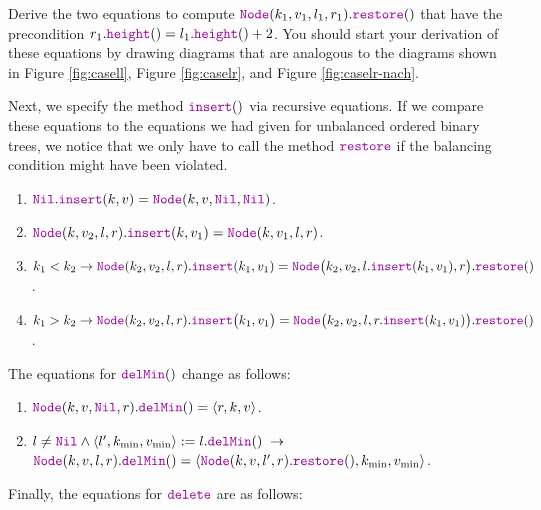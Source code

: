 \exercise
Derive the two equations to compute $\mytt{Node}(k_1,v_1,l_1,r_1).\mytt{restore}()$ that have the
precondition $r_1.\mytt{height}() = l_1.\mytt{height}() + 2$.  You should start your derivation of these
equations by drawing diagrams that are analogous to the diagrams shown in Figure \ref{fig:casell}, Figure
\ref{fig:caselr}, and Figure \ref{fig:caselr-nach}. 
\eox

Next, we specify the method  $\mytt{insert}()$ via recursive equations.
If we compare these equations to the equations we had given for unbalanced ordered binary trees, we
notice that we only have to call the method $\mytt{restore}$ if the balancing condition might have
been violated.
\begin{enumerate}
\item $\mytt{Nil}.\mytt{insert}(k,v) = \mytt{Node}(k,v, \mytt{Nil}, \mytt{Nil})$.  
\item $\mytt{Node}(k, v_2, l, r).\mytt{insert}(k,v_1) = \mytt{Node}(k, v_1, l, r)$.
\item $k_1 < k_2 \rightarrow 
          \mytt{Node}(k_2, v_2, l, r).\mytt{insert}(k_1, v_1) =
          \mytt{Node}\bigl(k_2, v_2, l.\mytt{insert}(k_1,v_1), r\bigr).\mytt{restore}()$.
\item $k_1 > k_2 \rightarrow 
         \mytt{Node}(k_2, v_2, l, r).\mytt{insert}\bigl(k_1, v_1\bigr) = 
         \mytt{Node}\bigl(k_2, v_2, l, r.\mytt{insert}(k_1,v_1)\bigr).\mytt{restore}()$.
\end{enumerate}
The equations for  $\mytt{delMin}()$ change as follows:
\begin{enumerate}
\item $\mytt{Node}(k, v, \mytt{Nil}, r).\mytt{delMin}() = \langle r, k, v \rangle$.
\item $l\not= \mytt{Nil} \wedge \langle l',k_{\textrm{min}}, v_{\textrm{min}}\rangle := l.\mytt{delMin}() 
       \;\rightarrow$ \\[0.2cm]
       \hspace*{1.3cm} 
       $\mytt{Node}(k, v, l, r).\mytt{delMin}() = 
        \langle \mytt{Node}(k, v, l', r).\mytt{restore}(), k_{\textrm{min}}, v_{\textrm{min}} \rangle$.
\end{enumerate}
Finally, the equations for $\mytt{delete}$ are as follows:
